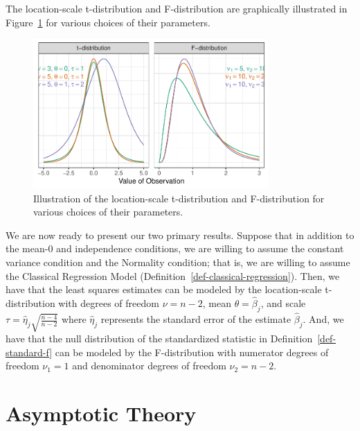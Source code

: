 \documentclass[
  letterpaper,
  DIV=11,
  numbers=noendperiod]{scrreprt}
\theoremstyle{plain}
\theoremstyle{definition}
\theoremstyle{definition}
\theoremstyle{remark}
\begin{document}
The location-scale t-distribution and F-distribution are graphically
illustrated in Figure~\ref{fig-app-theory-tf} for various choices of
their parameters.

\begin{figure}

{\centering \includegraphics[width=0.8\textwidth,height=\textheight]{./images/fig-app-theory-tf-1.pdf}

}

\caption{\label{fig-app-theory-tf}Illustration of the location-scale
t-distribution and F-distribution for various choices of their
parameters.}

\end{figure}

We are now ready to present our two primary results. Suppose that in
addition to the mean-0 and independence conditions, we are willing to
assume the constant variance condition and the Normality condition; that
is, we are willing to assume the Classical Regression Model
(Definition~\ref{def-classical-regression}). Then, we have that the
least squares estimates can be modeled by the location-scale
t-distribution with degrees of freedom \(\nu = n - 2\), mean
\(\theta = \widehat{\beta}_j\), and scale
\(\tau = \widehat{\eta}_j\sqrt{\frac{n - 4}{n - 2}}\) where
\(\widehat{\eta}_j\) represents the standard error of the estimate
\(\widehat{\beta}_j\). And, we have that the null distribution of the
standardized statistic in Definition~\ref{def-standard-f} can be modeled
by the F-distribution with numerator degrees of freedom \(\nu_1 = 1\)
and denominator degrees of freedom \(\nu_2 = n - 2\).

\hypertarget{asymptotic-theory}{%
\section{Asymptotic Theory}\label{asymptotic-theory}}
\end{document}
